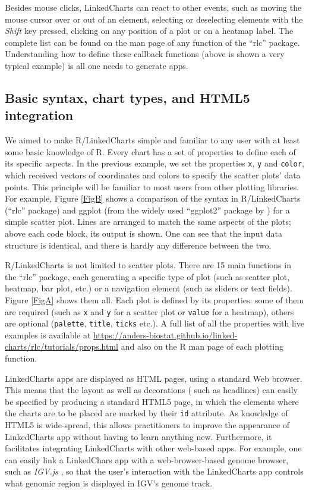 \documentclass[twocolumn,10pt]{article}
\begin{document}
Besides mouse clicks, LinkedCharts can react to other events, such as moving the mouse cursor over or out of an element, selecting or deselecting elements with the \emph{Shift} key pressed, clicking on any position of a plot or on a heatmap label. The complete list can be found on the man page of any function of the ``rlc'' package. Understanding how to define these callback functions (above is shown a very typical example) is all one needs to generate apps. 

\subsection{Basic syntax, chart types, and HTML5 integration}

We aimed to make R/LinkedCharts simple and familiar to any user with at least some basic knowledge of R. Every chart has a set of properties to define each of its specific aspects. In the previous example, we set the properties \texttt{x}, \texttt{y} and \texttt{color}, which received vectors of coordinates and colors to specify the scatter plots' data points. This principle will be familiar to most users from other plotting libraries. For example, Figure \ref{FigB} shows a comparison of the syntax in R/LinkedCharts (``rlc'' package) and ggplot (from the widely used ``ggplot2'' package by \citet{wickham_2016}) for a simple scatter plot. Lines are arranged to match the same aspects of the plots; above each code block, its output is shown. One can see that the input data structure is identical, and there is hardly any difference between the two.

R/LinkedCharts is not limited to scatter plots. There are 15 main functions in the ``rlc'' package, each generating a specific type of plot (such as scatter plot, heatmap, bar plot, etc.) or a navigation element (such as sliders or text fields). Figure \ref{FigA} shows them all. Each plot is defined by its properties: some of them are required (such as \texttt{x} and \texttt{y} for a scatter plot or \texttt{value} for a heatmap), others are optional (\texttt{palette}, \texttt{title}, \texttt{ticks} etc.). A full list of all the properties with live examples is available at \url{https://anders-biostat.github.io/linked-charts/rlc/tutorials/props.html} and also on the R man page of each plotting function.

LinkedCharts apps are displayed as HTML pages, using a standard Web browser. This means that the layout as well as decorations ( such as headlines) can easily be specified by producing a standard HTML5 page, in which the elements where the charts are to be placed are marked by their \texttt{id} attribute. As knowledge of HTML5 is wide-spread, this allows practitioners to improve the appearance of LinkedCharts app without having to learn anything new. Furthermore, it facilitates integrating LinkedCharts with other web-based apps. For example, one can easily link a LinkedChars app with a web-browser-based genome browser, such as \emph{IGV.js} \cite{robinson_2020}, so that the user's interaction with the LinkedCharts app controls what genomic region is displayed in IGV's genome track.
\end{document}

